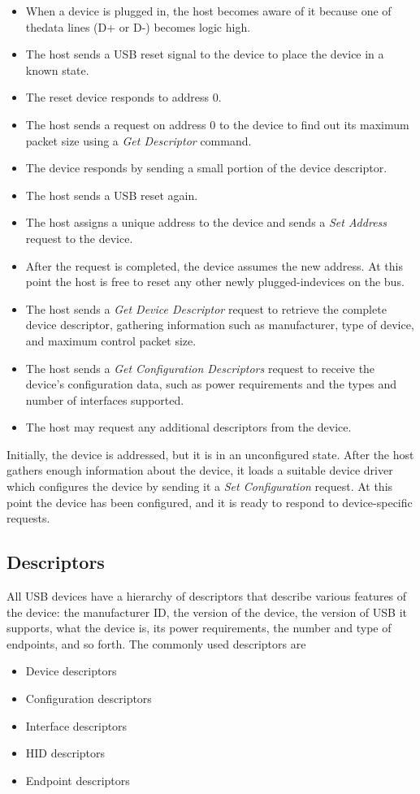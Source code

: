 \documentclass{article}
\begin{document}
\begin{itemize}
    \item When a device is plugged in, the host becomes aware of it because one of thedata lines (D+ or D-) becomes logic high.
    \item The host sends a USB reset signal to the device to place the device in a known state.
    \item The reset device responds to address 0.
    \item The host sends a request on address 0 to the device to find out its maximum packet size using a \emph{Get Descriptor} command.
    \item The device responds by sending a small portion of the device descriptor.
    \item The host sends a USB reset again.
    \item The host assigns a unique address to the device and sends a \emph{Set Address} request to the device.
    \item After the request is completed, the device assumes the new address. At this point the host is free to reset any other newly plugged-indevices on the bus.
    \item The host sends a \emph{Get Device Descriptor} request to retrieve the complete device descriptor, gathering information such as manufacturer, type of device, and maximum control packet size.
    \item The host sends a \emph{Get Configuration Descriptors} request to receive the device’s configuration data, such as power requirements and the types and number of interfaces supported.
    \item The host may request any additional descriptors from the device.
\end{itemize}

Initially, the device is addressed, but it is in an unconfigured state.
After the host gathers enough information about the device, it loads a suitable device driver which configures the device by sending it a \emph{Set Configuration} request.
At this point the device has been configured, and it is ready to respond to device-specific requests.

\subsection{Descriptors}
All USB devices have a hierarchy of descriptors that describe various features of the device: the manufacturer ID, the version of the device, the version of USB it supports, what the device is, its power requirements, the number and type of endpoints, and so forth.
The commonly used descriptors are
\begin{itemize}
    \item Device descriptors
    \item Configuration descriptors
    \item Interface descriptors
    \item HID descriptors
    \item Endpoint descriptors
\end{itemize}
\end{document}
